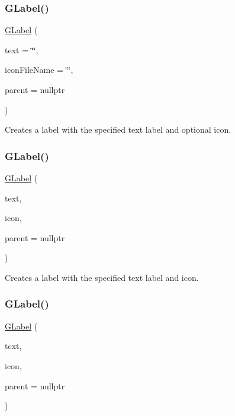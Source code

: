 \subsubsection{\texorpdfstring{G\+Label()}{GLabel()}\hspace{0.1cm}{\footnotesize\ttfamily [1/3]}}
{\footnotesize\ttfamily \mbox{\hyperlink{classsgl_1_1GLabel}{G\+Label}} (\begin{DoxyParamCaption}\item[{const std\+::string \&}]{text = {\ttfamily \char`\"{}\char`\"{}},  }\item[{const std\+::string \&}]{icon\+File\+Name = {\ttfamily \char`\"{}\char`\"{}},  }\item[{Q\+Widget $\ast$}]{parent = {\ttfamily nullptr} }\end{DoxyParamCaption})}



Creates a label with the specified text label and optional icon. 

\mbox{\label{classsgl_1_1GLabel_a66c34c2b874bdb9dc0561b87ac2fccdd}} 
\subsubsection{\texorpdfstring{G\+Label()}{GLabel()}\hspace{0.1cm}{\footnotesize\ttfamily [2/3]}}
{\footnotesize\ttfamily \mbox{\hyperlink{classsgl_1_1GLabel}{G\+Label}} (\begin{DoxyParamCaption}\item[{const std\+::string \&}]{text,  }\item[{const Q\+Icon \&}]{icon,  }\item[{Q\+Widget $\ast$}]{parent = {\ttfamily nullptr} }\end{DoxyParamCaption})}



Creates a label with the specified text label and icon. 

\mbox{\label{classsgl_1_1GLabel_ad3979ef59a046161fc57992d97bebe54}} 
\subsubsection{\texorpdfstring{G\+Label()}{GLabel()}\hspace{0.1cm}{\footnotesize\ttfamily [3/3]}}
{\footnotesize\ttfamily \mbox{\hyperlink{classsgl_1_1GLabel}{G\+Label}} (\begin{DoxyParamCaption}\item[{const std\+::string \&}]{text,  }\item[{const Q\+Pixmap \&}]{icon,  }\item[{Q\+Widget $\ast$}]{parent = {\ttfamily nullptr} }\end{DoxyParamCaption})}



